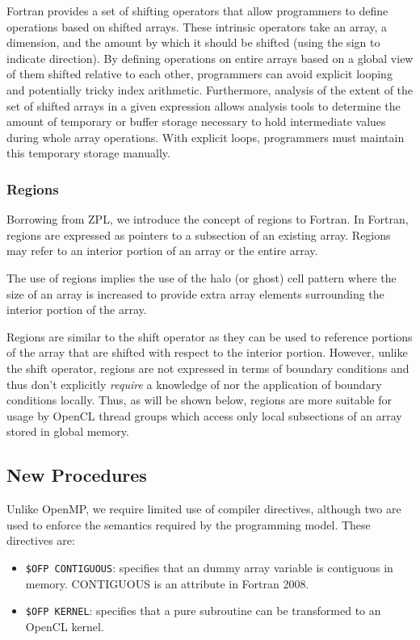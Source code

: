 Fortran provides a set of shifting operators that allow programmers to
define operations based on shifted arrays.  These intrinsic operators take
an array, a dimension, and the amount by which it should be shifted (using
the sign to indicate direction).  By defining operations on entire arrays
based on a global view of them shifted relative to each other, programmers can
avoid explicit looping and potentially tricky index arithmetic.  Furthermore,
analysis of the extent of the set of shifted arrays in a given expression
allows analysis tools to determine the amount of temporary or buffer storage
necessary to hold intermediate values during whole array operations.  With
explicit loops, programmers must maintain this temporary storage manually.

\subsubsection*{Regions}

Borrowing from ZPL, we introduce the concept of regions to Fortran.  In
Fortran, regions are expressed as pointers to a subsection of an existing array.
Regions may refer to an interior portion of an array or the entire array.

The use of regions implies the use of the halo (or ghost) cell pattern 
where the size of an array is increased to provide extra array elements
surrounding the interior portion of the array.  

Regions are similar to the shift operator as they can be used to reference
portions of the array that are shifted with respect to the interior portion.
However, unlike the shift operator, regions are not expressed in terms of
boundary conditions and thus don't explicitly \emph{require} a knowledge of
nor the application of boundary conditions locally.  Thus, as will be shown
below, regions are more suitable for usage by OpenCL thread groups which
access only local subsections of an array stored in global memory.

\subsection{New Procedures}

Unlike OpenMP, we require limited use of compiler directives, although
two are used to enforce the semantics required by the programming
model.  These directives are:
\begin{itemize}
   \item {\tt \!\$OFP CONTIGUOUS}: specifies that an dummy array variable is
   contiguous in memory. CONTIGUOUS is an attribute in Fortran 2008.
   \item {\tt \!\$OFP KERNEL}: specifies that a pure subroutine can be
     transformed to an OpenCL kernel.
\end{itemize}

